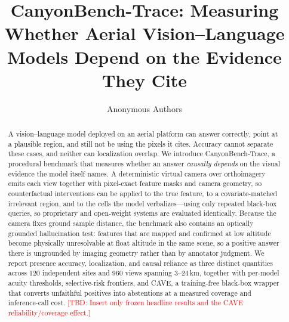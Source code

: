 \documentclass[10pt]{article}
\title{CanyonBench-Trace: Measuring Whether Aerial Vision--Language Models
Depend on the Evidence They Cite}
\author{Anonymous Authors}
\date{}
\newcommand{\TBD}[1]{\textcolor{red}{[TBD: #1]}}
\begin{document}
\maketitle
\begin{abstract}
A vision--language model deployed on an aerial platform can answer correctly, point
at a plausible region, and still not be using the pixels it cites. Accuracy cannot
separate these cases, and neither can localization overlap. We introduce
CanyonBench-Trace, a procedural benchmark that measures whether an answer
\emph{causally depends} on the visual evidence the model itself names. A
deterministic virtual camera over orthoimagery emits each view together with
pixel-exact feature masks and camera geometry, so counterfactual interventions can
be applied to the true feature, to a covariate-matched irrelevant region, and to
the cells the model verbalizes---using only repeated black-box queries, so
proprietary and open-weight systems are evaluated identically. Because the camera
fixes ground sample distance, the benchmark also contains an optically grounded
hallucination test: features that are mapped and confirmed at low altitude become
physically unresolvable at float altitude in the same scene, so a positive answer
there is ungrounded by imaging geometry rather than by annotator judgment. We
report presence accuracy, localization, and causal reliance as three distinct
quantities across 120 independent sites and 960 views spanning 3--24\,km, together
with per-model acuity thresholds, selective-risk frontiers, and CAVE, a
training-free black-box wrapper that converts unfaithful positives into
abstentions at a measured coverage and inference-call cost.
\TBD{Insert only frozen headline results and the CAVE reliability/coverage effect.}
\end{abstract}









\appendix

\end{document}
